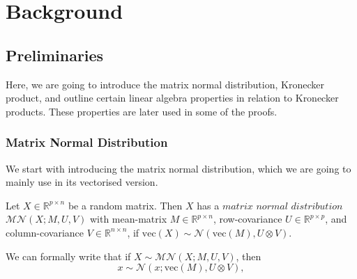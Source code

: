 \documentclass{mldsmsc}
\begin{document}

\chapter{Background}

\section{Preliminaries}

Here, we are going to introduce the matrix normal distribution, Kronecker product, and outline certain linear algebra properties in relation to Kronecker products. These properties are later used in some of the proofs.

\subsection{Matrix Normal Distribution}

We start with introducing the matrix normal distribution, which we are going to mainly use in its vectorised version.

\begin{definition} \label{def:mvn}
    Let $X \in \mathbb{R}^{p \times n}$ be a random matrix. Then $X$ has a $\textit{matrix normal distribution}$ $\mathcal{MN}(X; M, U, V)$ with mean-matrix $M \in \mathbb{R}^{p \times n}$, row-covariance $U \in \mathbb{R}^{p \times p}$, and column-covariance $V \in \mathbb{R}^{n \times n}$, if $\text{vec}(X) \sim \mathcal{N}(\text{vec}(M), U \otimes V)$.
\end{definition}

\noindent We can formally write that if $X \sim \mathcal{MN}(X; M, U, V)$, then 
\begin{equation} \label{eq:mndvec}
    x \sim \mathcal{N}(x; \text{vec}(M), U \otimes V),
\end{equation}
\end{document}

